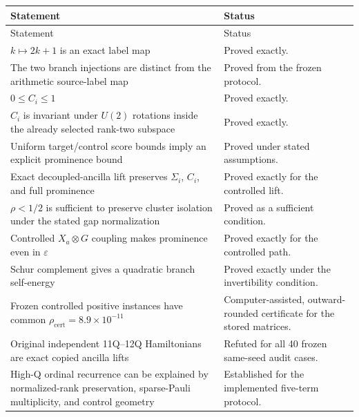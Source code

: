 \documentclass[11pt,a4paper]{article}
\newcommand{\eps}{\varepsilon}
\begin{document}
\begin{longtable}{@{}p{}p{}@{}}
\toprule
Statement & Status\\
\midrule
\endfirsthead
\toprule
Statement & Status\\
\midrule
\endhead

\(k\mapsto2k+1\) is an exact label map &
Proved exactly.\\

The two branch injections are distinct from the arithmetic source-label map &
Proved from the frozen protocol.\\

\(0\le C_i\le1\) &
Proved exactly.\\

\(C_i\) is invariant under \(U(2)\) rotations inside the already selected
rank-two subspace &
Proved exactly.\\

Uniform target/control score bounds imply an explicit prominence bound &
Proved under stated assumptions.\\

Exact decoupled-ancilla lift preserves \(\Sigma_i\), \(C_i\), and full
prominence &
Proved exactly for the controlled lift.\\

\(\rho<1/2\) is sufficient to preserve cluster isolation under the stated
gap normalization &
Proved as a sufficient condition.\\

Controlled \(X_a\otimes G\) coupling makes prominence even in \(\eps\) &
Proved exactly for the controlled path.\\

Schur complement gives a quadratic branch self-energy &
Proved exactly under the invertibility condition.\\

Frozen controlled positive instances have common
\(\rho_{\mathrm{cert}}=8.9\times10^{-11}\) &
Computer-assisted, outward-rounded certificate for the stored matrices.\\

Original independent 11Q--12Q Hamiltonians are exact copied ancilla lifts &
Refuted for all 40 frozen same-seed audit cases.\\

High-Q ordinal recurrence can be explained by normalized-rank preservation,
sparse-Pauli multiplicity, and control geometry &
Established for the implemented five-term protocol.\\


\end{longtable}
\end{document}
